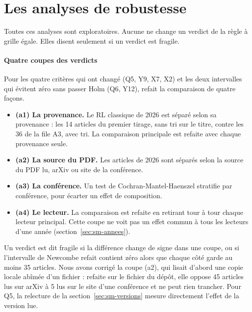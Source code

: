 \section{Les analyses de robustesse}\label{sec:sm-robustesse}

Toutes ces analyses sont exploratoires. Aucune ne change un verdict de la règle à grille égale. Elles disent
seulement si un verdict est fragile.

\paragraph{Quatre coupes des verdicts}
Pour les quatre critères qui ont changé (Q5, Y9, X7, X2) et les deux intervalles qui évitent zéro sans
passer Holm (Q6, Y12),  refait la comparaison de quatre façons.
\begin{itemize}
  \item \textbf{(a1) La provenance.} Le RL classique de 2026 est séparé selon sa provenance : les 14
  articles du premier tirage, sans tri sur le titre, contre les 36 de la file A3, avec tri. La
  comparaison principale est refaite avec chaque provenance seule.
  \item \textbf{(a2) La source du PDF.} Les articles de 2026 sont séparés selon la source du PDF lu,
  arXiv ou site de la conférence.
  \item \textbf{(a3) La conférence.} Un test de Cochran-Mantel-Haenszel stratifie par conférence, pour
  écarter un effet de composition.
  \item \textbf{(a4) Le lecteur.} La comparaison est refaite en retirant tour à tour chaque lecteur
  principal. Cette coupe ne voit pas un effet commun à tous les lecteurs d'une année
  (section~\ref{sec:sm-annees}).
\end{itemize}
Un verdict est dit fragile si la différence change de signe dans une coupe, ou si l'intervalle de Newcombe
refait contient zéro alors que chaque côté garde au moins 35 articles. Nous avons corrigé la coupe
(a2), qui lisait d'abord une copie locale abîmée d'un fichier : refaite sur le fichier du dépôt, elle
oppose 45 articles lus sur arXiv à 5 lus sur le site d'une conférence et ne peut rien trancher. Pour Q5, la
relecture de la section~\ref{sec:sm-versions} mesure directement l'effet de la version lue.

